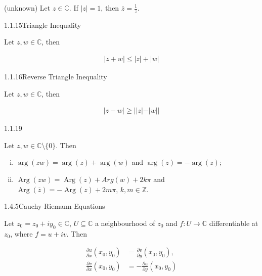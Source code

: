 \documentclass[10pt,landscape]{article}
\renewcommand{\leq}{\leqslant}
\renewcommand{\geq}{\geqslant}
\DeclareMathOperator{\Arg}{Arg}
\begin{document}
\begin{multicols}{3}
\begin{remark}{(unknown)}{}
    Let $z \in \mathbb{C}$. If $|z| = 1$, then $\overline{z} = \displaystyle \frac{1}{z}$.

\end{remark}

\begin{lemma}{1.1.15}{Triangle Inequality}

    Let $z,w \in \mathbb{C}$, then

        \begin{align*}
            |z + w| \leq |z| + |w|
        \end{align*}

\end{lemma}

\begin{lemma}{1.1.16}{Reverse Triangle Inequality}

    Let $z,w \in \mathbb{C}$, then

        \begin{align*}
             |z - w| \geq ||z| - |w||
        \end{align*}

\end{lemma}

\begin{proposition}{1.1.19}{}

    Let $z,w \in \mathbb{C} \setminus \{0\}$. Then

        \begin{enumerate}[(i)]
            \setlength{\parskip}{0em}
            \item $\arg(zw) = \arg(z) + \arg(w)$ and $\arg(\overline{z}) = -\arg(z)$;
            \item $\Arg(zw) = \Arg(z) + Arg(w) + 2k\pi$ and $\Arg(\overline{z}) = -\Arg(z) + 2m\pi$, $k,m \in \mathbb{Z}$.
        \end{enumerate}

\end{proposition}

\begin{theorem}{1.4.5}{Cauchy-Riemann Equations}

    Let $z_0 = z_0 + iy_0 \in \mathbb{C}$, $U \subseteq \mathbb{C}$ a neighbourhood of $z_0$ and $f: U \to \mathbb{C}$ differentiable at $z_0$, where $f = u + iv$. Then

        \begin{align*}
            \frac{\partial u}{\partial x}(x_0,y_0) &= \frac{\partial v}{\partial y}(x_0,y_0), \\
            \frac{\partial v}{\partial x}(x_0,y_0) &= -\frac{\partial u}{\partial y}(x_0,y_0)
        \end{align*}


\end{theorem}
\end{multicols}
\end{document}
